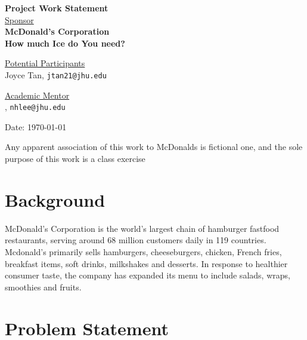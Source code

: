 \documentclass[12pt,letterpaper]{article}
\theoremstyle{definition}
\begin{document}
\def\shiftdowna{0.32in}  %
\def\shiftdownb{0.22in}  %


\begin{center}
\textbf{{\large Project Work Statement}}\\


\vspace \shiftdowna
\underline {Sponsor}\\ 
\vspace{5pt}
\textbf{{\large McDonald's Corporation}}\\


\vspace \shiftdowna
\textbf{{\large How much Ice do You need?}}

\vspace \shiftdownb
\underline {Potential Participants}\\
\vspace{5pt}
Joyce Tan, \texttt{jtan21@jhu.edu} \\
\vspace{2pt}

\vspace{0.35in}
\vspace \shiftdownb
\underline {Academic Mentor} \\
\vspace{5pt}
, \texttt{nhlee@jhu.edu}

\vspace \shiftdowna
Date: \today

\end{center}

\vfill  
\footnoterule
\noindent \small{Any apparent association of this work to McDonalds is
fictional one, and the sole purpose of this work is a class exercise}

\newpage

\section{Background} 
McDonald's Corporation is the world's largest chain of hamburger fastfood restaurants, serving around 68 million customers daily in 119 countries. Mcdonald's primarily sells hamburgers, cheeseburgers, chicken, French fries, breakfast items, soft drinks, milkshakes and desserts. In response to healthier consumer taste, the company has expanded its menu to include salads, wraps,
smoothies and fruits.

\section{Problem Statement}
\end{document}
